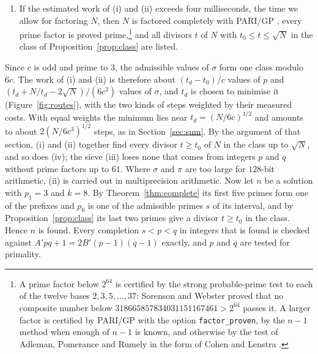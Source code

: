 \documentclass[11pt,reqno]{amsart}
\numberwithin{equation}{section}
\theoremstyle{plain}
\theoremstyle{definition}
\theoremstyle{remark}
\begin{document}
\begin{enumerate}[label=\textup{(\roman*)}, leftmargin=*]
  particular every value that comes from primes.
\item If the estimated work of (i) and (ii) exceeds four milliseconds,
  the time we allow for factoring $N$, then $N$ is factored completely with
  PARI/GP \cite{PARI}, every prime factor is proved
  prime,\footnote{A prime factor below $2^{64}$ is certified by the
  strong probable-prime test to each of the twelve bases
  $2,3,5,\dots,37$: Sorenson and Webster \cite{SW17} proved that no
  composite number below $318665857834031151167461>2^{64}$ passes it.
  A larger factor is certified by PARI/GP with the option
  \texttt{factor\_proven}, by the $n-1$ method \cite{BLS75} when enough
  of $n-1$ is known, and otherwise by the test of Adleman, Pomerance and
  Rumely \cite{APR83} in the form of Cohen and Lenstra \cite{CL84}.} and all
  divisors $t$ of $N$ with $t_0\le t\le\sqrt N$ in the class of
  Proposition~\ref{prop:class} are listed.
\end{enumerate}
Since $c$ is odd and prime to $3$, the admissible values of $\sigma$
form one class modulo $6c$. The work of (i) and (ii) is therefore about
$(t_d-t_0)/c$ values of $p$ and $(t_d+N/t_d-2\sqrt N)/(6c^2)$ values of
$\sigma$, and $t_d$ is chosen to minimise it (Figure~\ref{fig:routes}),
with the two kinds of steps weighted by their measured costs. With equal weights the minimum
lies near $t_d=(N/6c)^{1/2}$ and amounts to about $2(N/6c^3)^{1/2}$
steps, as in Section~\ref{sec:sum}. By the argument of that section,
(i) and (ii) together find every divisor $t\ge t_0$ of $N$ in the class
up to $\sqrt N$, and so does (iv); the sieve (iii) loses none that
comes from integers $p$ and $q$ without prime factors up to $61$. Where
$\sigma$ and $\pi$ are too large for $128$-bit arithmetic, (ii) is
carried out in multiprecision arithmetic. Now let $n$ be a solution with
$p_1=3$ and $k=8$. By Theorem~\ref{thm:complete} its first five primes
form one of the prefixes and $p_6$ is one of the admissible primes $s$
of its interval, and by Proposition~\ref{prop:class} its last two
primes give a divisor $t\ge t_0$ in the class. Hence $n$ is found.
Every completion $s<p<q$ in integers that is found is checked against
$A'pq+1=2B'(p-1)(q-1)$ exactly, and $p$ and $q$ are tested for
primality.
\end{document}
